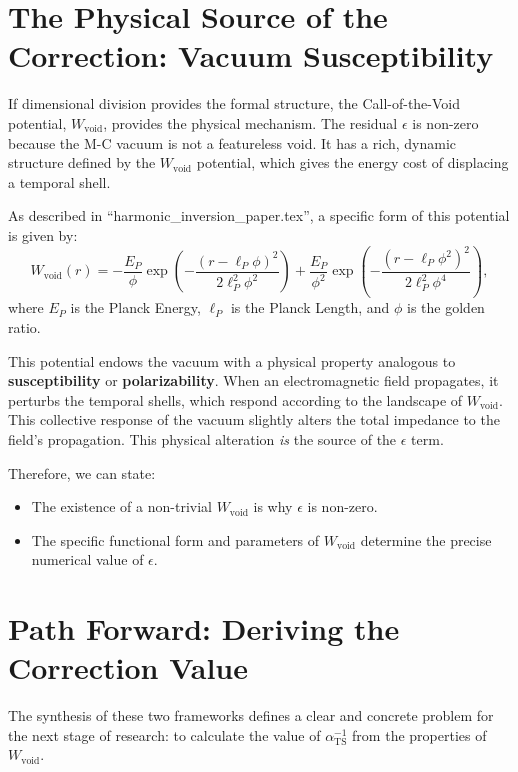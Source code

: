 \documentclass[11pt,a4paper]{article}
\begin{document}
\section{The Physical Source of the Correction: Vacuum Susceptibility}

If dimensional division provides the formal structure, the Call-of-the-Void potential, $W_{\text{void}}$, provides the physical mechanism. The residual $\epsilon$ is non-zero because the M-C vacuum is not a featureless void. It has a rich, dynamic structure defined by the $W_{\text{void}}$ potential, which gives the energy cost of displacing a temporal shell.

As described in ``harmonic\_inversion\_paper.tex'', a specific form of this potential is given by:
\begin{equation}
 W_{\text{void}}(r) = -\frac{E_P}{\phi} \exp\left(-\frac{(r - \ell_P\phi)^2}{2\ell_P^2\phi^2}\right) + \frac{E_P}{\phi^2} \exp\left(-\frac{(r - \ell_P\phi^2)^2}{2\ell_P^2\phi^4}\right),
\end{equation}
where $E_P$ is the Planck Energy, $\ell_P$ is the Planck Length, and $\phi$ is the golden ratio.

This potential endows the vacuum with a physical property analogous to \textbf{susceptibility} or \textbf{polarizability}. When an electromagnetic field propagates, it perturbs the temporal shells, which respond according to the landscape of $W_{\text{void}}$. This collective response of the vacuum slightly alters the total impedance to the field's propagation. This physical alteration \emph{is} the source of the $\epsilon$ term.

Therefore, we can state:
\begin{itemize}
    \item The existence of a non-trivial $W_{\text{void}}$ is why $\epsilon$ is non-zero.
    \item The specific functional form and parameters of $W_{\text{void}}$ determine the precise numerical value of $\epsilon$.
\end{itemize}

\section{Path Forward: Deriving the Correction Value}

The synthesis of these two frameworks defines a clear and concrete problem for the next stage of research: to calculate the value of $\alpha^{-1}_{\text{TS}}$ from the properties of $W_{\text{void}}$.
\end{document}
